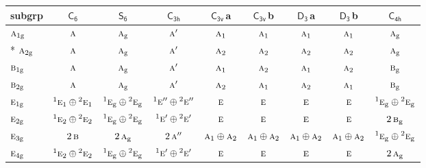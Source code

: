 \documentclass[10pt,a4paper]{article}
\numberwithin{equation}{section}
\newcommand{\grp}[1]{\mathsf{#1}}
\newcommand{\irr}[1]{\text{\normalfont\scshape #1}}
\newcommand{\conjpair}[1]{{}^{#1}}
\newcommand{\ptag}[1]{\mathrm{#1}}
\newcommand{\clsletter}[1]{\,{\scriptsize\color{black!55}#1}}
\begin{document}
{\small\begin{longtable}{@{}lcccccccc@{}}\toprule
subgrp & \href{C6.pdf}{$\grp{C_{6}}$} & \href{S6.pdf}{$\grp{S_{6}}$} & \href{C3h.pdf}{$\grp{C_{3h}}$} & \href{C3v.pdf}{$\grp{C_{3v}}$}\clsletter{a} & \href{C3v.pdf}{$\grp{C_{3v}}$}\clsletter{b} & \href{D3.pdf}{$\grp{D_{3}}$}\clsletter{a} & \href{D3.pdf}{$\grp{D_{3}}$}\clsletter{b} & \href{C4h.pdf}{$\grp{C_{4h}}$}\\\midrule\endhead
\bottomrule\endfoot\endlastfoot
$\irr{a}_{1\ptag{g}}$ & $\irr{a}$ & $\irr{a}_{\ptag{g}}$ & $\irr{a}'$ & $\irr{a}_{1}$ & $\irr{a}_{1}$ & $\irr{a}_{1}$ & $\irr{a}_{1}$ & $\irr{a}_{\ptag{g}}$\\*
$\irr{a}_{2\ptag{g}}$ & $\irr{a}$ & $\irr{a}_{\ptag{g}}$ & $\irr{a}'$ & $\irr{a}_{2}$ & $\irr{a}_{2}$ & $\irr{a}_{2}$ & $\irr{a}_{2}$ & $\irr{a}_{\ptag{g}}$\\
$\irr{b}_{1\ptag{g}}$ & $\irr{a}$ & $\irr{a}_{\ptag{g}}$ & $\irr{a}'$ & $\irr{a}_{1}$ & $\irr{a}_{2}$ & $\irr{a}_{1}$ & $\irr{a}_{2}$ & $\irr{b}_{\ptag{g}}$\\
$\irr{b}_{2\ptag{g}}$ & $\irr{a}$ & $\irr{a}_{\ptag{g}}$ & $\irr{a}'$ & $\irr{a}_{2}$ & $\irr{a}_{1}$ & $\irr{a}_{2}$ & $\irr{a}_{1}$ & $\irr{b}_{\ptag{g}}$\\
$\irr{e}_{1\ptag{g}}$ & $\conjpair{1}\irr{e}_{1}\oplus \conjpair{2}\irr{e}_{1}$ & $\conjpair{1}\irr{e}_{\ptag{g}}\oplus \conjpair{2}\irr{e}_{\ptag{g}}$ & $\conjpair{1}\irr{e}''\oplus \conjpair{2}\irr{e}''$ & $\irr{e}$ & $\irr{e}$ & $\irr{e}$ & $\irr{e}$ & $\conjpair{1}\irr{e}_{\ptag{g}}\oplus \conjpair{2}\irr{e}_{\ptag{g}}$\\
$\irr{e}_{2\ptag{g}}$ & $\conjpair{1}\irr{e}_{2}\oplus \conjpair{2}\irr{e}_{2}$ & $\conjpair{1}\irr{e}_{\ptag{g}}\oplus \conjpair{2}\irr{e}_{\ptag{g}}$ & $\conjpair{1}\irr{e}'\oplus \conjpair{2}\irr{e}'$ & $\irr{e}$ & $\irr{e}$ & $\irr{e}$ & $\irr{e}$ & $2\,\irr{b}_{\ptag{g}}$\\
$\irr{e}_{3\ptag{g}}$ & $2\,\irr{b}$ & $2\,\irr{a}_{\ptag{g}}$ & $2\,\irr{a}''$ & $\irr{a}_{1}\oplus \irr{a}_{2}$ & $\irr{a}_{1}\oplus \irr{a}_{2}$ & $\irr{a}_{1}\oplus \irr{a}_{2}$ & $\irr{a}_{1}\oplus \irr{a}_{2}$ & $\conjpair{1}\irr{e}_{\ptag{g}}\oplus \conjpair{2}\irr{e}_{\ptag{g}}$\\
$\irr{e}_{4\ptag{g}}$ & $\conjpair{1}\irr{e}_{2}\oplus \conjpair{2}\irr{e}_{2}$ & $\conjpair{1}\irr{e}_{\ptag{g}}\oplus \conjpair{2}\irr{e}_{\ptag{g}}$ & $\conjpair{1}\irr{e}'\oplus \conjpair{2}\irr{e}'$ & $\irr{e}$ & $\irr{e}$ & $\irr{e}$ & $\irr{e}$ & $2\,\irr{a}_{\ptag{g}}$\\

\end{longtable}}
\end{document}
